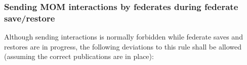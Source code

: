 \begin{compactstdpage}
    \subsubsection{Sending MOM interactions by federates during federate save/restore}

    Although sending interactions is normally forbidden while federate saves and restores are in progress, the following deviations to this rule shall be allowed (assuming the correct publications are in place):

\end{compactstdpage}

\clearpage

